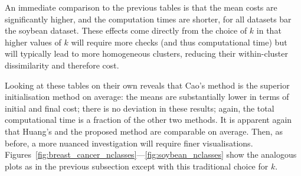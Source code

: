 \begin{table}
    \begin{subtable}{\textwidth}
        \resizebox{\textwidth}{!}{%
            
        }
        \caption{%
            the breast cancer dataset with \(k=2\)%
        }\label{tab:breast_cancer_nclasses}
    \end{subtable}\vspace{1em}

    \begin{subtable}{\textwidth}
        \resizebox{\textwidth}{!}{%
            
        }
        \caption{%
            the mushroom dataset with \(k=2\)%
        }\label{tab:mushroom_nclasses}
    \end{subtable}\vspace{1em}

    \begin{subtable}{\textwidth}
        \resizebox{\textwidth}{!}{}
        \caption{%
            the nursery dataset with \(k=5\)
        }\label{tab:nursery_nclasses}
    \end{subtable}\vspace{1em}

    \begin{subtable}{\textwidth}
        \resizebox{\textwidth}{!}{}
        \caption{%
            the soybean dataset with \(k=15\)
        }\label{tab:soybean_nclasses}
    \end{subtable}

    \caption{%
        Metric results when using the number of classes
    }\label{tab:metrics_nclasses}
\end{table}

An immediate comparison to the previous tables is that the mean costs are
significantly higher, and the computation times are shorter, for all datasets
bar the soybean dataset. These effects come directly from the choice of \(k\) in
that higher values of \(k\) will require more checks (and thus computational
time) but will typically lead to more homogeneous clusters, reducing their
within-cluster dissimilarity and therefore cost.

Looking at these tables on their own reveals that Cao's method is the superior
initialisation method on average: the means are substantially lower in terms of
initial and final cost; there is no deviation in these results; again, the total
computational time is a fraction of the other two methods. It is apparent again
that Huang's and the proposed method are comparable on average. Then, as before,
a more nuanced investigation will require finer visualisations.
Figures~\ref{fig:breast_cancer_nclasses}---\ref{fig:soybean_nclasses} show the
analogous plots as in the previous subsection except with this traditional
choice for \(k\).

